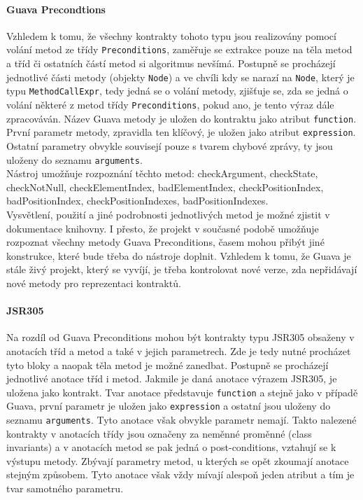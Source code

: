 			\paragraph{Guava Precondtions}
				Vzhledem k tomu, že všechny kontrakty tohoto typu jsou realizovány pomocí volání metod ze třídy \texttt{Preconditions}, zaměřuje se extrakce pouze na těla metod a tříd či ostatních částí metod si algoritmus nevšímá. Postupně se procházejí jednotlivé části metody (objekty \texttt{Node}) a ve chvíli kdy se narazí na \texttt{Node}, který je typu \texttt{MethodCallExpr}, tedy jedná se o volání metody, zjišťuje se, zda se jedná o volání některé z metod třídy \texttt{Preconditions}, pokud ano, je tento výraz dále zpracováván. Název Guava metody je uložen do kontraktu jako atribut \texttt{function}. První parametr metody, zpravidla ten klíčový, je uložen jako atribut \texttt{expression}. Ostatní parametry obvykle souvisejí pouze s tvarem chybové zprávy, ty jsou uloženy do seznamu \texttt{arguments}.\\				
				
				Nástroj umožňuje rozpoznání těchto metod: checkArgument, checkState, checkNotNull, checkElementIndex, badElementIndex, checkPositionIndex, badPositionIndex, checkPositionIndexes, badPositionIndexes.\\
				
				Vysvětlení, použití a jiné podrobnosti jednotlivých metod je možné zjistit v dokumentace knihovny. I přesto, že projekt v současné podobě umožňuje rozpoznat všechny metody Guava Preconditions, časem mohou přibýt jiné konstrukce, které bude třeba do nástroje doplnit. Vzhledem k tomu, že Guava je stále živý projekt, který se vyvíjí, je třeba kontrolovat nové verze, zda nepřidávají nové metody pro reprezentaci kontraktů.	
				
			\paragraph{JSR305}
				Na rozdíl od Guava Preconditions mohou být kontrakty typu JSR305 obsaženy v anotacích tříd a metod a také v jejich parametrech. Zde je tedy nutné procházet tyto bloky a naopak těla metod je možné zanedbat. Postupně se procházejí jednotlivé anotace tříd i metod. Jakmile je daná anotace výrazem JSR305, je uložena jako kontrakt. Tvar anotace představuje \texttt{function} a stejně jako v případě Guava, první parametr je uložen jako \texttt{expression} a ostatní jsou uloženy do seznamu \texttt{arguments}. Tyto anotace však obvykle parametr nemají. Takto nalezené kontrakty v anotacích třídy jsou označeny za neměnné proměnné (class invariants) a v anotacích metod se pak jedná o post-conditions, vztahují se k výstupu metody. Zbývají parametry metod, u kterých se opět zkoumají anotace stejným způsobem. Tyto anotace však vždy mívají alespoň jeden atribut a tím je tvar samotného parametru.\\			


